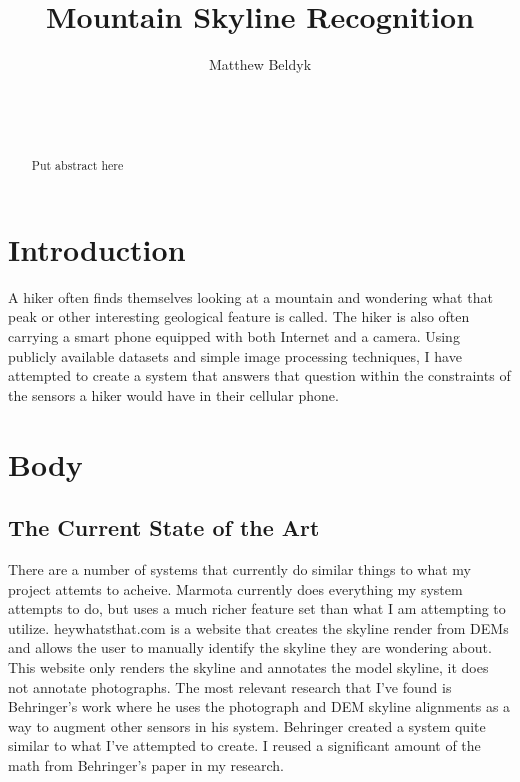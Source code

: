 \documentclass{acm_proc_article-sp}
\begin{document}
\title{Mountain Skyline Recognition}



%
\author{
\alignauthor
Matthew Beldyk\\
       \\
       \\
       \\
}

\maketitle
\begin{abstract}
Put abstract here
\end{abstract}

\section{Introduction}
A hiker often finds themselves looking at a mountain and wondering what that peak or other interesting geological feature is called.  The hiker is also often carrying a smart phone equipped with both Internet and a camera.  Using publicly available datasets and simple image processing techniques, I have attempted to create a system that answers that question within the constraints of the sensors a hiker would have in their cellular phone.  
\section{Body}
\subsection{The Current State of the Art}
There are a number of systems that currently do similar things to what my project attemts to acheive.  Marmota currently does everything my system attempts to do, but uses a much richer feature set than what I am attempting to utilize.\cite{chippendale2009environmental, chippendale2009spatial}  heywhatsthat.com is a website that creates the skyline render from DEMs and allows the user to manually identify the skyline they are wondering about.  This website only renders the skyline and annotates the model skyline, it does not annotate photographs.  The most relevant research that I’ve found is Behringer’s work \cite{behringer2002registration} where he uses the photograph and DEM skyline alignments as a way to augment other sensors in his system.  Behringer created a system quite similar to what I’ve attempted to create. I reused a significant amount of the math from Behringer’s paper in my research.
\end{document}
